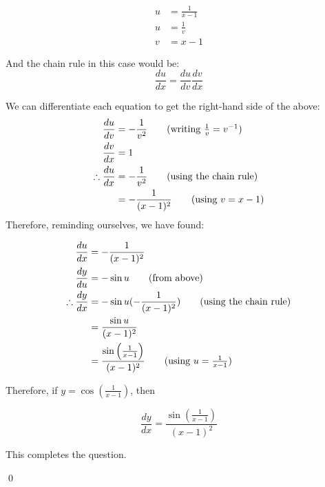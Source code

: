 \begin{solution}
    \begin{align*}
        u &= \frac{1}{x-1}\\
        u &= \frac{1}{v} \tag{what we want}\\
        v &= x - 1 \tag{to get what we want}
    \end{align*}

    And the chain rule in this case would be:
    \[ \frac{du}{dx} = \frac{du }{dv}\frac{dv }{dx}\]

    We can differentiate each equation to get the right-hand side of the above:
    \begin{align*}
        \frac{du }{dv} &= -\frac{1}{v^2} \tag{writing $\frac{1}{v} = v^{-1}$}\\
        \frac{dv }{dx} &= 1 \\
        \therefore \frac{du}{dx} &= -\frac{1}{v^2} \tag{using the chain rule}\\
        &= -\frac{1 }{(x-1)^2} \tag{using $v = x-1$}
    \end{align*}
    Therefore, reminding ourselves, we have found:

    \begin{align*}
        \frac{du}{dx} &= -\frac{1 }{(x-1)^2} \\
        \frac{dy }{du} &= -\sin u \tag{from above}\\
        \therefore \frac{dy }{dx} &= -\sin u (-\frac{1 }{(x-1)^2}) \tag{using the chain rule}\\
        &= \frac{\sin u }{(x-1)^2} \\
        &= \frac{\sin \left( \frac{1}{x-1}\right)}{(x-1)^2} \tag{using $u =  \frac{1}{x-1}$}
    \end{align*}

    Therefore, if $y = \cos\left(\frac{1}{x-1}\right)$, then 

    \[\frac{dy }{dx} = \frac{\sin \left( \frac{1}{x-1}\right)}{(x-1)^2}\]

    This completes the question.

    \qed
\end{solution}


